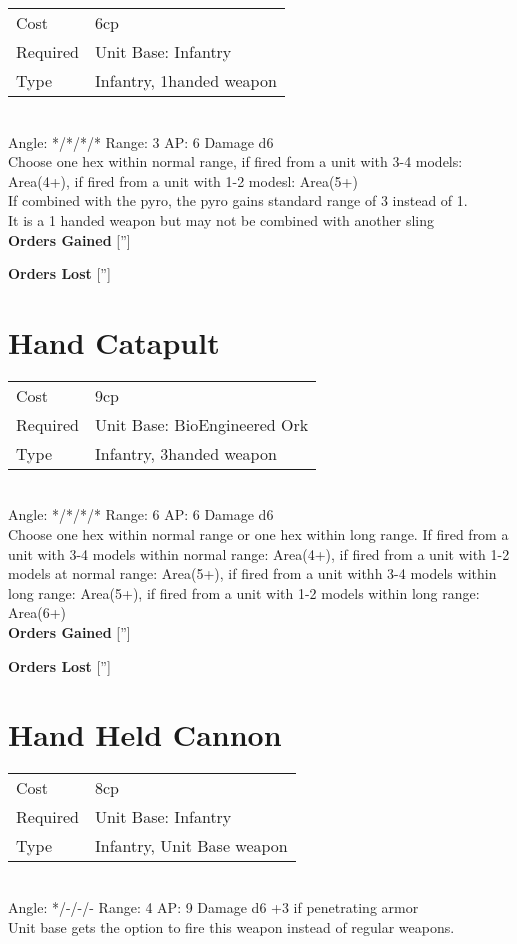 \begin{tabular}{ll}
    Cost & 6cp \\
    Required & Unit Base: Infantry\\
    Type & Infantry, 1handed weapon\\
\end{tabular}
\ \\
\indent Angle: */*/*/* Range: 3  AP: 6 Damage d6 \\
Choose one hex within normal range, if fired from a unit with 3-4 models: Area(4+), if fired from a unit with 1-2 modesl: Area(5+) \\ If combined with the pyro, the pyro gains standard range of 3 instead of 1. \\ It is a 1 handed weapon but may not be combined with another sling
\ \\

{\bf Orders Gained}
['']

{\bf Orders Lost}
['']
\section{ Hand Catapult }

\begin{tabular}{ll}
    Cost & 9cp \\
    Required & Unit Base: BioEngineered Ork\\
    Type & Infantry, 3handed weapon\\
\end{tabular}
\ \\
\indent Angle: */*/*/* Range: 6  AP: 6 Damage d6 \\
Choose one hex within normal range or one hex within long range. If fired from a unit with 3-4 models within normal range: Area(4+), if fired from a unit with 1-2 models at normal range: Area(5+), if fired from a unit withh 3-4 models within long range: Area(5+), if fired from a unit with 1-2 models within long range: Area(6+)
\ \\

{\bf Orders Gained}
['']

{\bf Orders Lost}
['']
\section{ Hand Held Cannon }

\begin{tabular}{ll}
    Cost & 8cp \\
    Required & Unit Base: Infantry\\
    Type & Infantry, Unit Base weapon\\
\end{tabular}
\ \\
\indent Angle: */-/-/- Range: 4  AP: 9 Damage d6 +3 if penetrating armor \\
Unit base gets the option to fire this weapon instead of regular weapons. 
\ \\

